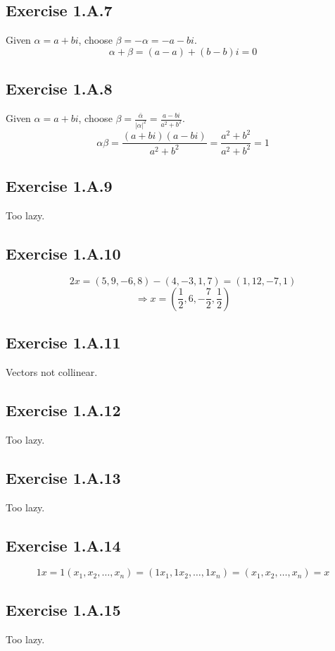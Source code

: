 \documentclass{book}
\begin{document}
\subsection*{Exercise 1.A.7}
Given $\alpha = a + bi$, choose $\beta = -\alpha = -a - bi$.
$$\alpha + \beta = (a - a) + (b - b)i = 0$$

\subsection*{Exercise 1.A.8}
Given $\alpha = a + bi$, choose $\beta = \frac{\bar{\alpha}}{|\alpha|^2} = \frac{a - bi}{a^2 + b^2}$.
$$\alpha \beta = \frac{(a + bi)(a - bi)}{a^2 + b^2} = \frac{a^2 + b^2}{a^2 + b^2} = 1$$

\subsection*{Exercise 1.A.9}
Too lazy.

\subsection*{Exercise 1.A.10}
$$2x = (5, 9, -6, 8) - (4, -3, 1, 7) = (1, 12, -7, 1)$$
$$\Rightarrow x = \left(\frac{1}{2}, 6, -\frac{7}{2}, \frac{1}{2}\right)$$

\subsection*{Exercise 1.A.11}
Vectors not collinear.

\subsection*{Exercise 1.A.12}
Too lazy.

\subsection*{Exercise 1.A.13}
Too lazy.

\subsection*{Exercise 1.A.14}
$$1x = 1(x_1, x_2, \ldots, x_n) = (1x_1, 1x_2, \ldots, 1x_n) = (x_1, x_2, \ldots, x_n) = x$$

\subsection*{Exercise 1.A.15}
Too lazy.
\end{document}
